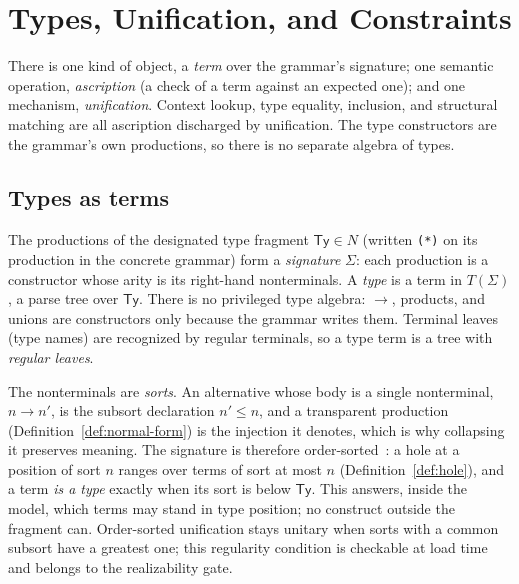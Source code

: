 \section{Types, Unification, and Constraints}
\label{sec:constraints}

There is one kind of object, a \emph{term} over the grammar's signature; one
semantic operation, \emph{ascription} (a check of a term against an expected
one); and one mechanism, \emph{unification}. Context lookup, type equality,
inclusion, and structural matching are all ascription discharged by unification.
The type constructors are the grammar's own productions, so there is no separate
algebra of types.

\subsection{Types as terms}

\begin{definition}
  \label{def:term-language}
  The productions of the designated type fragment $\mathsf{Ty} \in N$ (written
  \texttt{(*)} on its production in the concrete grammar) form a
  \emph{signature} $\Sigma$: each production is a constructor whose arity is its
  right-hand nonterminals. A \emph{type} is a term in $T(\Sigma)$, a parse tree
  over $\mathsf{Ty}$. There is no privileged type algebra: $\to$, products, and
  unions are constructors only because the grammar writes them. Terminal leaves
  (type names) are recognized by regular terminals, so a type term is a tree
  with \emph{regular leaves}.
\end{definition}

\begin{remark}
  \label{rem:sorts}
  The nonterminals are \emph{sorts}. An alternative whose body is a single
  nonterminal, $n \to n'$, is the subsort declaration $n' \leq n$, and a
  transparent production (Definition~\ref{def:normal-form}) is the injection it
  denotes, which is why collapsing it preserves meaning. The signature is
  therefore order-sorted~\cite{goguen1992order}: a hole at a position of sort
  $n$ ranges over terms of sort at most $n$
  (Definition~\ref{def:hole}), and a term \emph{is a type} exactly when its
  sort is below $\mathsf{Ty}$. This answers, inside the model, which terms may
  stand in type position; no construct outside the fragment can. Order-sorted
  unification stays unitary when sorts with a common subsort have a greatest
  one; this regularity condition is checkable at load time and belongs to the
  realizability gate.
\end{remark}

